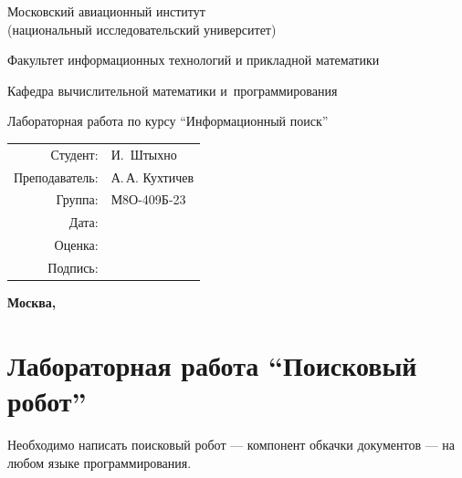 \documentclass[12pt,a4paper,oneside,fleqn]{article}
\newcommand{\CWHeader}[1]{\section*{#1}}
\newcommand{\StudentName}{И.~Штыхно}
\newcommand{\StudentGroup}{М8О-409Б-23}
\begin{document}
\begin{titlepage}
\begin{center}
\bfseries

{\Large Московский авиационный институт\\ (национальный исследовательский университет)

}

\vspace{48pt}

{\large Факультет информационных технологий и прикладной математики
}

\vspace{36pt}

{\large Кафедра вычислительной математики и~программирования

}

\vspace{48pt}

Лабораторная работа  по курсу \enquote{Информационный поиск}

\end{center}

\vspace{72pt}

\begin{flushright}
\begin{tabular}{rl}
Студент: & \StudentName \\
Преподаватель: & А.\,А. Кухтичев \\
Группа: & \StudentGroup \\
Дата: & \\
Оценка: & \\
Подпись: & \\
\end{tabular}
\end{flushright}

\vfill

\begin{center}
\bfseries
Москва, \the\year
\end{center}
\end{titlepage}

\pagebreak

\CWHeader{Лабораторная работа  \enquote{Поисковый робот}}

Необходимо написать поисковый робот --- компонент обкачки документов --- на любом языке программирования.
\end{document}
